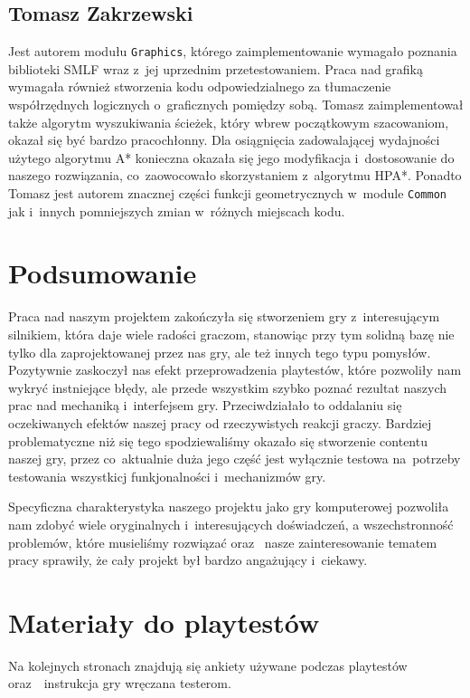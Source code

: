 \documentclass[licencjacka]{pracamgr}
\begin{document}
  \section{Tomasz Zakrzewski}
    Jest autorem modułu \texttt{Graphics}, którego zaimplementowanie wymagało poznania biblioteki SMLF wraz z~jej uprzednim przetestowaniem.
    Praca nad grafiką wymagała również stworzenia kodu odpowiedzialnego za tłumaczenie współrzędnych logicznych o~graficznych pomiędzy sobą.
    Tomasz zaimplementował także algorytm wyszukiwania ścieżek, który wbrew początkowym szacowaniom, okazał się być bardzo pracochłonny.
    Dla osiągnięcia zadowalającej wydajności użytego algorytmu A* konieczna okazała się jego modyfikacja i~dostosowanie do naszego rozwiązania,
    co~zaowocowało skorzystaniem z~algorytmu HPA*. Ponadto Tomasz jest autorem znacznej części funkcji geometrycznych w~module \texttt{Common}
    jak i~innych pomniejszych zmian w~różnych miejscach kodu.

\chapter{Podsumowanie}
  Praca nad naszym projektem zakończyła się stworzeniem gry z~interesującym silnikiem, która daje wiele radości graczom,
  stanowiąc przy tym solidną bazę nie tylko dla zaprojektowanej przez nas gry, ale też innych tego typu pomysłów.
  Pozytywnie zaskoczył nas efekt przeprowadzenia playtestów, które pozwoliły nam wykryć instniejące błędy, 
  ale przede wszystkim szybko poznać rezultat naszych prac nad mechaniką i~interfejsem gry. Przeciwdziałało to oddalaniu
  się oczekiwanych efektów naszej pracy od rzeczywistych reakcji graczy. Bardziej problematyczne niż się tego
  spodziewaliśmy okazało się stworzenie contentu naszej gry, przez co~aktualnie duża jego część jest wyłącznie testowa
  na~potrzeby testowania wszystkicj funkjonalności i~mechanizmów gry. 

  Specyficzna charakterystyka naszego projektu jako gry komputerowej pozwoliła nam zdobyć wiele oryginalnych i~interesujących
  doświadczeń, a wszechstronność problemów, które musieliśmy rozwiązać oraz~ nasze zainteresowanie tematem pracy sprawiły,
  że cały projekt był bardzo angażujący i~ciekawy.


\appendix

\chapter{Materiały do playtestów}
  Na kolejnych stronach znajdują się ankiety używane podczas playtestów
  oraz~~instrukcja gry wręczana testerom.
\end{document}
